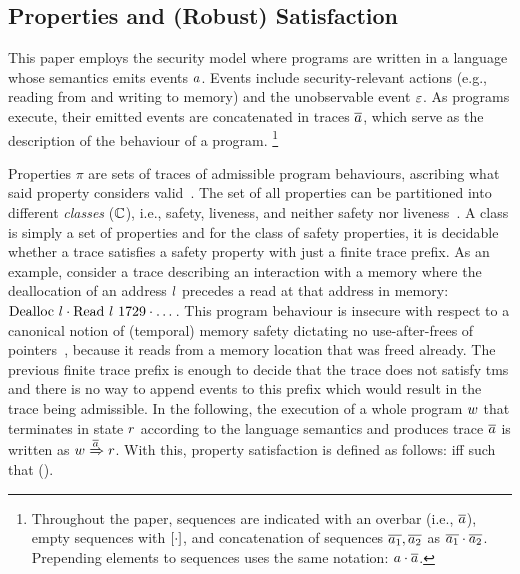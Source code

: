 \documentclass[utf8,acmsmall,review,screen,dvipsnames,anonymous]{acmart}
\begin{document}
\subsection{Properties and (Robust) Satisfaction}\label{subsec:bg:tprop}

This paper employs the security model where programs are written in a language whose semantics emits events $\event$.
Events include security-relevant actions (e.g., reading from and writing to memory) and the unobservable event $\emptyevent$.
As programs execute, their emitted events are concatenated in traces $\trace$, which serve as the description of the behaviour of a program.%
\footnote{
Throughout the paper, sequences are indicated with an overbar (i.e., $\trace$), empty sequences with $\hole{\cdot}$, and concatenation of sequences $\trace[_{1}],\trace[_{2}]$ as $\trace[_{1}]\cdot\trace[_{2}]$.
Prepending elements to sequences uses the same notation: $\event\cdot\trace$.
}

Properties $\pi$ are sets of traces of admissible program behaviours, ascribing what said property considers valid~\cite{clarkson2008hyper}.
The set of all properties can be partitioned into different {\em classes} ($\class$), i.e., safety, liveness, and neither safety nor liveness~\cite{clarkson2008hyper}.
A class is simply a set of properties and for the class of safety properties, it is decidable whether a trace satisfies a safety property with just a finite trace prefix.
As an example, consider a trace describing an interaction with a memory where the deallocation of an address $\loc$ precedes a read at that address in memory: $\ev{Dealloc\ \loc}\cdot\ev{Read\ \loc\ 1729}\cdot\dots$.
This program behaviour is insecure with respect to a canonical notion of (temporal) memory safety dictating no use-after-frees of pointers~\cite{nagarakatte2010cets,azevedo2018meaningsofms}, because it reads from a memory location that was freed already.
The previous finite trace prefix is enough to decide that the trace does not satisfy \gls{tms} and there is no way to append events to this prefix which would result in the trace being admissible.
In the following, the execution of a whole program $\wholeprogvar$ that terminates in state $\runtimetermvar$ according to the language semantics and produces trace $\trace$ is written as $\progstepto{\wholeprogvar}{\runtimetermvar}{\trace}$.
With this, property satisfaction is defined as follows:
 iff  such that  ().
\end{document}
